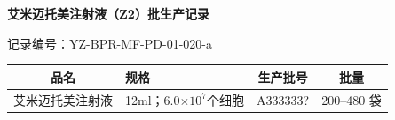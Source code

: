 \documentclass[UTF8,10pt,a4paper,fontset=fandol]{ctexart}
\newcommand{\fieldvalue}[1]{#1}
\newcommand{\handwritten}[1]{#1}
\begin{document}
\begin{center}
\textbf{艾米迈托美注射液（Z2）批生产记录}
\end{center}

\noindent
记录编号：YZ-BPR-MF-PD-01-020-a

\begin{tabularx}{\textwidth}{|c|X|c|c|}
\hline
品名 & 规格 & 生产批号 & 批量 \\
\hline
艾米迈托美注射液 & 12ml；6.0$\times 10^{7}$个细胞 & 
\fieldvalue{\handwritten{A333333?}} &
200--480 袋 \\
\hline
\end{tabularx}

\vspace{2pt}
\end{document}
